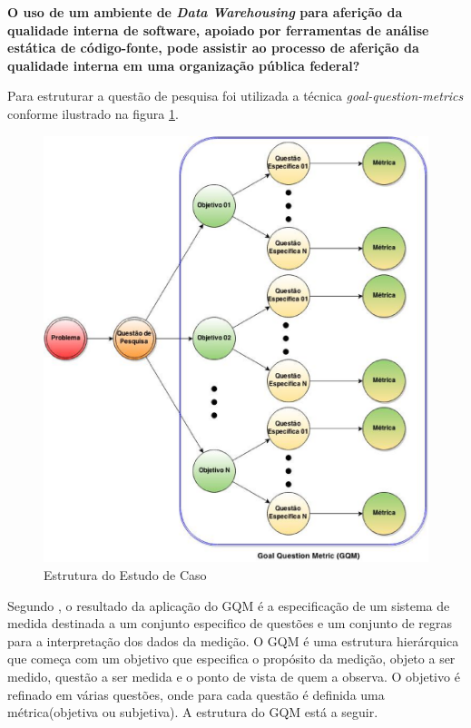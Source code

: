 \textbf{O uso de um ambiente de \textit{Data Warehousing} para aferição da qualidade interna de software, apoiado por ferramentas de análise estática de código-fonte,  pode assistir ao processo de aferição da qualidade interna em uma organização pública federal?}

Para estruturar a questão de pesquisa foi utilizada a técnica \textit{goal-question-metrics} conforme ilustrado na figura \ref{EstruturaEstudoCaso}. 

\begin{figure}[H]
\centering
\includegraphics[keepaspectratio=false,scale=0.5]{figuras/figuras_nilton/EstruturaEstudoCaso.eps}
\caption{Estrutura do Estudo de Caso}
\label{EstruturaEstudoCaso}
\end{figure}

Segundo \cite{Basili96b}, o resultado da aplicação do GQM é a especificação de um sistema de medida destinada a um conjunto especifico de questões e um conjunto de regras para a interpretação dos dados da medição. O GQM é uma estrutura hierárquica que começa com um objetivo que especifica o propósito da medição, objeto a ser medido, questão a ser medida e o ponto de vista de quem a observa. O objetivo é refinado em várias questões, onde para cada questão é definida uma métrica(objetiva ou subjetiva)\cite{Basili96b}. A estrutura do GQM está a seguir.

